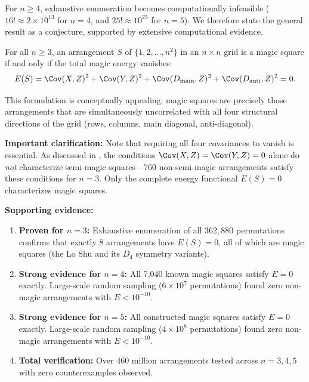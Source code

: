 For $n \geq 4$, exhaustive enumeration becomes computationally infeasible
($16! \approx 2 \times 10^{13}$ for $n = 4$, and $25! \approx 10^{25}$ for $n = 5$).
We therefore state the general result as a conjecture, supported by extensive computational evidence.

\begin{conjecture}
\label{conj:general}
For all $n \geq 3$, an arrangement $S$ of $\{1, 2, \ldots, n^2\}$ in an $n \times n$ grid 
is a magic square if and only if the total magic energy vanishes:
\begin{equation}
E(S) = \Cov(X, Z)^2 + \Cov(Y, Z)^2 + \Cov(D_{\mathrm{main}}, Z)^2 + \Cov(D_{\mathrm{anti}}, Z)^2 = 0.
\end{equation}
\end{conjecture}

This formulation is conceptually appealing: magic squares are precisely those arrangements 
that are simultaneously uncorrelated with all four structural directions of the grid
(rows, columns, main diagonal, anti-diagonal).

\textbf{Important clarification:} 
Note that requiring all four covariances to vanish is essential.
As discussed in , the conditions $\Cov(X, Z) = \Cov(Y, Z) = 0$ 
alone do \emph{not} characterize semi-magic squares---760 non-semi-magic arrangements 
satisfy these conditions for $n = 3$.
Only the complete energy functional $E(S) = 0$ characterizes magic squares.

\textbf{Supporting evidence:}
\begin{enumerate}
\item \textbf{Proven for $n = 3$:} Exhaustive enumeration of all $362{,}880$ permutations 
confirms that exactly 8 arrangements have $E(S) = 0$, all of which are magic squares 
(the Lo Shu and its $D_4$ symmetry variants).
\item \textbf{Strong evidence for $n = 4$:} All 7,040 known magic squares satisfy $E = 0$ exactly.
Large-scale random sampling ($6 \times 10^7$ permutations) found zero 
non-magic arrangements with $E < 10^{-10}$.
\item \textbf{Strong evidence for $n = 5$:} All constructed magic squares satisfy $E = 0$ exactly. 
Large-scale random sampling ($4 \times 10^8$ permutations) found zero 
non-magic arrangements with $E < 10^{-10}$.
\item \textbf{Total verification:} Over 460 million arrangements tested 
across $n = 3, 4, 5$ with zero counterexamples observed.
\end{enumerate}

